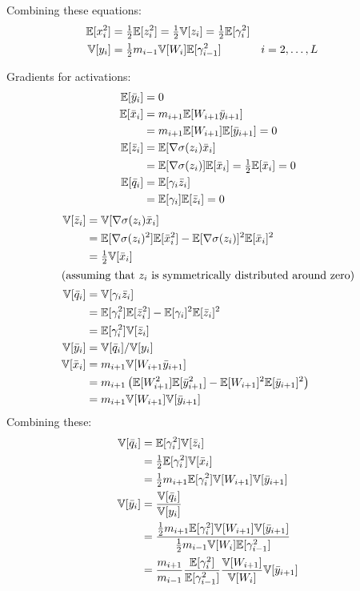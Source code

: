 Combining these equations:
\begin{align}
\mathbb{E}[x_{i}^2] & = \tfrac{1}{2} \mathbb{E}[z_{i}^2] = \tfrac{1}{2} \mathbb{V}[z_{i}] = \tfrac{1}{2} \mathbb{E}[\gamma_{i}^2] \\
\mathbb{V}[y_{i}] & = \tfrac{1}{2} m_{i-1} \mathbb{V}[W_{i}] \mathbb{E}[\gamma_{i-1}^2] && i = 2, \dots, L
\end{align}

Gradients for activations:
\begin{align}
\mathbb{E}[\bar{y}_{i}]
& = 0 \\
\mathbb{E}[\bar{x}_{i}]
& = m_{i+1} \mathbb{E}[W_{i+1} \bar{y}_{i+1}] \\
& = m_{i+1} \mathbb{E}[W_{i+1}] \mathbb{E}[\bar{y}_{i+1}] = 0 \\
\mathbb{E}[\bar{z}_{i}]
& = \mathbb{E}[\nabla\sigma(z_{i}) \bar{x}_{i}] \\
& = \mathbb{E}[\nabla\sigma(z_{i})] \mathbb{E}[\bar{x}_{i}] = \tfrac{1}{2} \mathbb{E}[\bar{x}_{i}] = 0 \\
\mathbb{E}[\bar{q}_{i}]
& = \mathbb{E}[\gamma_{i} \bar{z}_{i}] \\
& = \mathbb{E}[\gamma_{i}] \mathbb{E}[\bar{z}_{i}] = 0
\end{align}
\begin{align}
\mathbb{V}[\bar{z}_{i}]
& = \mathbb{V}[\nabla\sigma(z_{i}) \bar{x}_{i}] \\
& = \mathbb{E}[\nabla\sigma(z_{i})^2] \mathbb{E}[\bar{x}_{i}^2] - \mathbb{E}[\nabla\sigma(z_{i})]^2 \mathbb{E}[\bar{x}_{i}]^2 \\
& = \tfrac{1}{2} \mathbb{V}[\bar{x}_{i}] \\
\intertext{(assuming that $z_{i}$ is symmetrically distributed around zero)}
\mathbb{V}[\bar{q}_{i}] & = \mathbb{V}[\gamma_{i} \bar{z}_{i}] \\
& = \mathbb{E}[\gamma_{i}^2] \mathbb{E}[\bar{z}_{i}^2] - \mathbb{E}[\gamma_{i}]^2 \mathbb{E}[\bar{z}_{i}]^2 \\
& = \mathbb{E}[\gamma_{i}^2] \mathbb{V}[\bar{z}_{i}] \\
\mathbb{V}[\bar{y}_{i}] & = \mathbb{V}[\bar{q}_{i}] / \mathbb{V}[y_{i}] \\
\mathbb{V}[\bar{x}_{i}] & = m_{i+1} \mathbb{V}[W_{i+1} \bar{y}_{i+1}] \\
& = m_{i+1} \left( \mathbb{E}[W_{i+1}^2] \mathbb{E}[\bar{y}_{i+1}^2] - \mathbb{E}[W_{i+1}]^2 \mathbb{E}[\bar{y}_{i+1}]^2 \right) \\
& = m_{i+1} \mathbb{V}[W_{i+1}] \mathbb{V}[\bar{y}_{i+1}]
\end{align}
Combining these:
\begin{align}
\mathbb{V}[\bar{q}_{i}] & = \mathbb{E}[\gamma_{i}^2] \mathbb{V}[\bar{z}_{i}] \\
& = \tfrac{1}{2} \mathbb{E}[\gamma_{i}^2] \mathbb{V}[\bar{x}_{i}] \\
& = \tfrac{1}{2} m_{i+1} \mathbb{E}[\gamma_{i}^2] \mathbb{V}[W_{i+1}] \mathbb{V}[\bar{y}_{i+1}] \\
\mathbb{V}[\bar{y}_{i}] & = \frac{\mathbb{V}[\bar{q}_{i}]}{\mathbb{V}[y_{i}]} \\
& = \frac{
  \tfrac{1}{2} m_{i+1} \mathbb{E}[\gamma_{i}^2] \mathbb{V}[W_{i+1}] \mathbb{V}[\bar{y}_{i+1}] }{
  \tfrac{1}{2} m_{i-1} \mathbb{V}[W_{i}] \mathbb{E}[\gamma_{i-1}^2] } \\
& = \frac{m_{i+1}}{m_{i-1}} \frac{\mathbb{E}[\gamma_{i}^2]}{\mathbb{E}[\gamma_{i-1}^2]} \frac{\mathbb{V}[W_{i+1}]}{\mathbb{V}[W_{i}]} \mathbb{V}[\bar{y}_{i+1}]
\end{align}

